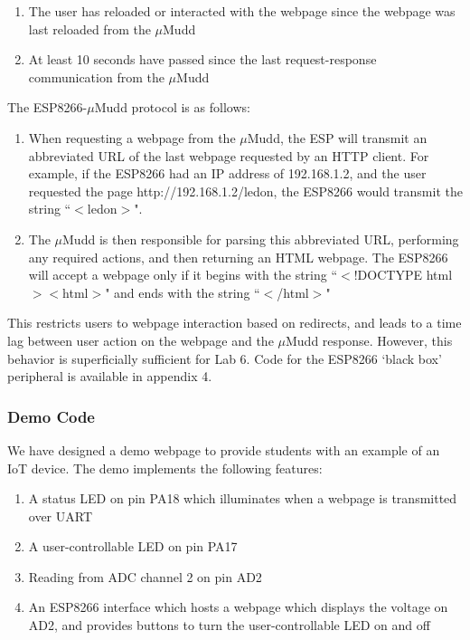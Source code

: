 \documentclass[12pt]{article}
\begin{document}
\begin{enumerate}
    \item The user has reloaded or interacted with the webpage since the webpage was last reloaded from the $\mu$Mudd
    \item At least 10 seconds have passed since the last request-response communication from the $\mu$Mudd
\end{enumerate}

The ESP8266-$\mu$Mudd protocol is as follows:

\begin{enumerate}
    \item When requesting a webpage from the $\mu$Mudd, the ESP will transmit an abbreviated URL of the last webpage requested by an HTTP client. For example, if the ESP8266 had an IP address of 192.168.1.2, and the user requested the page http://192.168.1.2/ledon, the ESP8266 would transmit the string ``$<$ledon$>$".
    \item The $\mu$Mudd is then responsible for parsing this abbreviated URL, performing any required actions, and then returning an HTML webpage. The ESP8266 will accept a webpage only if it begins with the string ``$<$!DOCTYPE html$><$html$>$" and ends with the string ``$<$/html$>$"
\end{enumerate}

This restricts users to webpage interaction based on redirects, and leads to a time lag between user action on the webpage and the $\mu$Mudd response. However, this behavior is superficially sufficient for Lab 6. Code for the ESP8266 `black box' peripheral is available in appendix 4. 

\subsubsection{Demo Code}

We have designed a demo webpage to provide students with an example of an IoT device. The demo implements the following features:

\begin{enumerate}
    \item A status LED on pin PA18 which illuminates when a webpage is transmitted over UART
    \item A user-controllable LED on pin PA17
    \item Reading from ADC channel 2 on pin AD2
    \item An ESP8266 interface which hosts a webpage which displays the voltage on AD2, and provides buttons to turn the user-controllable LED on and off
\end{enumerate}
\end{document}
